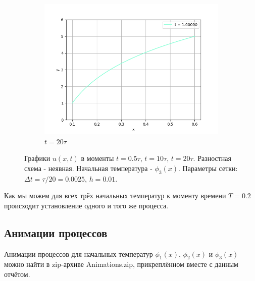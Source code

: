 \documentclass[12pt]{article}%
\begin{document}
\begin{figure}[H]
\begin{subfigure}{0.32\textwidth}
    \includegraphics[width=\textwidth]{implicit-phi3-time-1.00000.png}
    \caption{$t = 20 \tau$}
\end{subfigure}
\caption{Графики $u(x, t)$ в моменты $t = 0.5 \tau$, $t = 10 \tau$, $t = 20 \tau$. Разностная схема - неявная. Начальная температура - $\phi_3(x)$. Параметры сетки: $\Delta t = \tau / 20 = 0.0025$, $h=0.01$.}
\end{figure}

Как мы можем для всех трёх начальных температур к моменту времени $T=0.2$ происходит установление одного и того же процесса.

\subsection{Анимации процессов}
Анимации процессов для начальных температур $\phi_1(x)$, $\phi_2(x)$ и $\phi_3(x)$ можно найти в zip-архиве Animations.zip, прикреплённом вместе с данным отчётом.
\end{document}
